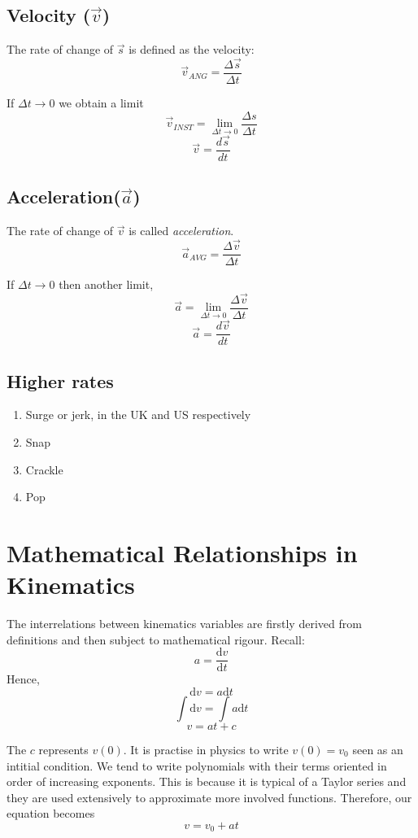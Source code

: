 \documentclass[letterpaper]{article}
\begin{document}
\subsection{Velocity ($\vec{v}$)}

The rate of change of $\vec{s}$ is defined as the velocity:
\[
    \vec{v}_{ANG} = \frac{\Delta{\vec{s}}}{\Delta{t}}
\]

If $\Delta{t} \rightarrow 0$ we obtain a limit
\[
    \vec{v}_{INST} = \lim_{\Delta{t} \rightarrow 0} {\frac{\Delta{s}}{\Delta{t}}}
\]
\[
    \vec{v} = \frac{d\vec{s}}{dt}
\]

\subsection{Acceleration($\vec{a}$)}

The rate of change of $\vec{v}$ is called {\em acceleration}.
\[
    \vec{a}_{AVG} = \frac{\Delta{\vec{v}}}{\Delta{t}}
\]

If $\Delta{t} \rightarrow 0$ then another limit,
\[
    \vec{a} = \lim_{\Delta{t} \rightarrow 0} {\frac{\Delta{\vec{v}}}{\Delta{t}}}
\]
\[
    \vec{a} = \frac{d\vec{v}}{dt}
\]

\subsection{Higher rates}
\begin{enumerate}
    \item Surge or jerk, in the UK and US respectively 
    \item Snap
    \item Crackle
    \item Pop
\end{enumerate}

\section{Mathematical Relationships in Kinematics}

The interrelations between kinematics variables are firstly derived
from definitions and then subject to mathematical rigour. Recall:
\[
    a = \frac{\text{d}v}{\text{d}t}
\]
Hence,
\[
    \text{d}v = a\text{d}t
\]
\[
    \int{\text{d}v} = \int{a\text{d}t}
\]
\[
    v = at + c
\]

The $c$ represents $v(0)$. It is practise in physics to write $v(0) = v_0$
seen as an intitial condition. We tend to write polynomials with their terms
oriented in order of increasing exponents. 
This is because it is typical of
a Taylor series and they are used extensively to approximate more involved
functions. Therefore, our equation becomes
\begin{equation} \label{v}
    v = v_0 + at
\end{equation}
\end{document}
